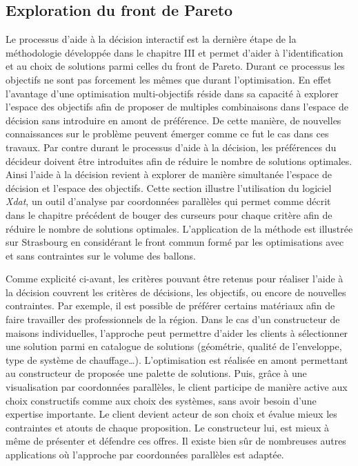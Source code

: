 \subsection{Exploration du front de Pareto} %
\label{sub:exploration_du_front_de_pareto}
Le processus d’aide à la décision interactif est la dernière étape de la méthodologie
développée dans le chapitre III et permet d’aider à l’identification et au choix de
solutions parmi celles du front de Pareto. Durant ce processus les objectifs ne sont pas
forcement les mêmes que durant l’optimisation. En effet l’avantage d’une optimisation
multi-objectifs réside dans sa capacité à explorer l’espace des objectifs afin de proposer
de multiples combinaisons dans l’espace de décision sans introduire en amont de
préférence. De cette manière, de nouvelles connaissances sur le problème peuvent émerger
comme ce fut le cas dans ces travaux. Par contre durant le processus d’aide à la décision,
les préférences du décideur doivent être introduites afin de réduire le nombre de
solutions optimales. Ainsi l’aide à la décision revient à explorer de manière simultanée
l’espace de décision et l’espace des objectifs. Cette section illustre l’utilisation du
logiciel \textit{Xdat}, un outil d’analyse par coordonnées parallèles qui permet comme
décrit dans le chapitre précédent de bouger des curseurs pour chaque critère afin de
réduire le nombre de solutions optimales. L’application de la méthode est illustrée
sur Strasbourg en considérant le front commun formé par les optimisations avec et sans
contraintes sur le volume des ballons.

Comme explicité ci-avant, les critères pouvant être retenus pour réaliser l’aide à la
décision couvrent les critères de décisions, les objectifs, ou encore de nouvelles
contraintes. Par exemple, il est possible de préférer certains matériaux afin de faire
travailler des professionnels de la région. Dans le cas d’un constructeur de maisons
individuelles, l’approche peut permettre d’aider  les clients à sélectionner une solution
parmi en catalogue de solutions (géométrie, qualité de l’enveloppe, type de système de chauffage\dots).
L’optimisation est réalisée en amont permettant au constructeur de proposée une palette de
solutions. Puis, grâce à une visualisation par coordonnées parallèles, le client participe
de manière active aux choix constructifs comme aux choix des systèmes, sans avoir besoin
d’une expertise importante. Le client devient acteur de son choix et évalue mieux
les contraintes et atouts de chaque proposition. Le constructeur lui, est mieux à même de
présenter et défendre ces offres. Il existe bien sûr de nombreuses autres applications où
l’approche par coordonnées parallèles est adaptée.

